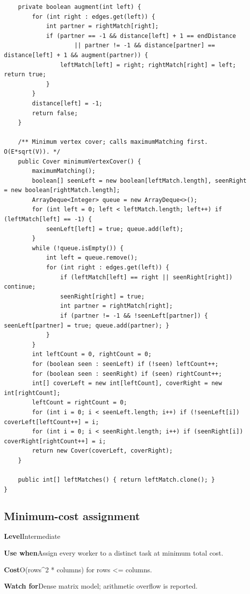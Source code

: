 \documentclass[10pt,letterpaper]{article}
\newcommand{\entrylabel}[1]{\textcolor{accent}{\bfseries #1}}
\begin{document}
\begin{lstlisting}
    private boolean augment(int left) {
        for (int right : edges.get(left)) {
            int partner = rightMatch[right];
            if (partner == -1 && distance[left] + 1 == endDistance
                    || partner != -1 && distance[partner] == distance[left] + 1 && augment(partner)) {
                leftMatch[left] = right; rightMatch[right] = left; return true;
            }
        }
        distance[left] = -1;
        return false;
    }

    /** Minimum vertex cover; calls maximumMatching first. O(E*sqrt(V)). */
    public Cover minimumVertexCover() {
        maximumMatching();
        boolean[] seenLeft = new boolean[leftMatch.length], seenRight = new boolean[rightMatch.length];
        ArrayDeque<Integer> queue = new ArrayDeque<>();
        for (int left = 0; left < leftMatch.length; left++) if (leftMatch[left] == -1) {
            seenLeft[left] = true; queue.add(left);
        }
        while (!queue.isEmpty()) {
            int left = queue.remove();
            for (int right : edges.get(left)) {
                if (leftMatch[left] == right || seenRight[right]) continue;
                seenRight[right] = true;
                int partner = rightMatch[right];
                if (partner != -1 && !seenLeft[partner]) { seenLeft[partner] = true; queue.add(partner); }
            }
        }
        int leftCount = 0, rightCount = 0;
        for (boolean seen : seenLeft) if (!seen) leftCount++;
        for (boolean seen : seenRight) if (seen) rightCount++;
        int[] coverLeft = new int[leftCount], coverRight = new int[rightCount];
        leftCount = rightCount = 0;
        for (int i = 0; i < seenLeft.length; i++) if (!seenLeft[i]) coverLeft[leftCount++] = i;
        for (int i = 0; i < seenRight.length; i++) if (seenRight[i]) coverRight[rightCount++] = i;
        return new Cover(coverLeft, coverRight);
    }

    public int[] leftMatches() { return leftMatch.clone(); }
}
\end{lstlisting}
\subsection{Minimum-cost assignment}
\begin{guidebox}\small
\entrylabel{Level}\quad Intermediate\par
\entrylabel{Use when}\quad Assign every worker to a distinct task at minimum total cost.\par
\entrylabel{Cost}\quad O(rows\textasciicircum{}2 * columns) for rows <= columns.\par
\entrylabel{Watch for}\quad Dense matrix model; arithmetic overflow is reported.\par
\end{guidebox}
\end{document}
